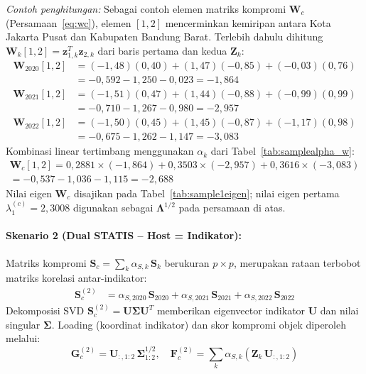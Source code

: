 \noindent\textit{Contoh penghitungan:} Sebagai contoh elemen matriks kompromi $\mathbf{W}_c$ (Persamaan~\ref{eq:wc}), elemen $[1,2]$ mencerminkan kemiripan antara Kota Jakarta Pusat dan Kabupaten Bandung Barat. Terlebih dahulu dihitung $\mathbf{W}_k[1,2] = \mathbf{z}_{1,k}^T \mathbf{z}_{2,k}$ dari baris pertama dan kedua $\mathbf{Z}_k$:
\begin{align*}
  \mathbf{W}_{2020}[1,2] &= (-1{,}48)(0{,}40)+(1{,}47)(-0{,}85)+(-0{,}03)(0{,}76) \\
  &= -0{,}592-1{,}250-0{,}023 = -1{,}864 \\
  \mathbf{W}_{2021}[1,2] &= (-1{,}51)(0{,}47)+(1{,}44)(-0{,}88)+(-0{,}99)(0{,}99) \\
  &= -0{,}710-1{,}267-0{,}980 = -2{,}957 \\
  \mathbf{W}_{2022}[1,2] &= (-1{,}50)(0{,}45)+(1{,}45)(-0{,}87)+(-1{,}17)(0{,}98) \\
  &= -0{,}675-1{,}262-1{,}147 = -3{,}083
\end{align*}
Kombinasi linear tertimbang menggunakan $\alpha_k$ dari Tabel~\ref{tab:samplealpha_w}:
\begin{multline*}
  \mathbf{W}_c[1,2] = 0{,}2881\times(-1{,}864)+0{,}3503\times(-2{,}957)+0{,}3616\times(-3{,}083) \\
  = -0{,}537-1{,}036-1{,}115 = -2{,}688
\end{multline*}
Nilai eigen $\mathbf{W}_c$ disajikan pada Tabel~\ref{tab:sample1eigen}; nilai eigen pertama $\lambda_1^{(c)}=2{,}3008$ digunakan sebagai $\mathbf{\Lambda}^{1/2}$ pada persamaan di atas.

\paragraph{Skenario 2 (Dual STATIS -- Host = Indikator):}
Matriks kompromi $\mathbf{S}_c = \sum_k \alpha_{S,k}\,\mathbf{S}_k$ berukuran $p \times p$, merupakan rataan terbobot matriks korelasi antar-indikator:
\begin{align*}
    \mathbf{S}_c^{(2)} &= \alpha_{S,2020}\,\mathbf{S}_{2020} + \alpha_{S,2021}\,\mathbf{S}_{2021} + \alpha_{S,2022}\,\mathbf{S}_{2022}
\end{align*}
Dekomposisi SVD $\mathbf{S}_c^{(2)} = \mathbf{U}\boldsymbol{\Sigma}\mathbf{U}^T$ memberikan eigenvector indikator $\mathbf{U}$ dan nilai singular $\boldsymbol{\Sigma}$. Loading (koordinat indikator) dan skor kompromi objek diperoleh melalui:
\begin{equation}
    \mathbf{G}_c^{(2)} = \mathbf{U}_{:,1:2}\,\boldsymbol{\Sigma}_{1:2}^{1/2}, \quad
    \mathbf{F}_c^{(2)} = \sum_k \alpha_{S,k}\left(\mathbf{Z}_k\,\mathbf{U}_{:,1:2}\right)
\end{equation}

